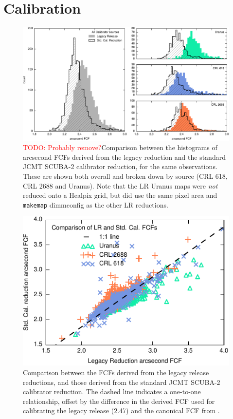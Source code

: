 \documentclass[twocolumn]{aastex6}
\newcommand{\todo}[1]{\textcolor{red}{TODO: #1}}
\begin{document}
\section{Calibration}
\begin{figure}
\includegraphics{legacyFCF-caldbFCF-histograms.pdf}
\caption{\todo{Probably remove?}Comparison between the histograms of
  arcsecond FCFs derived from the legacy reduction and the standard
  JCMT SCUBA-2 calibrator reduction, for the same observations.
  These are shown both overall and broken down by source (CRL 618,
  CRL 2688 and Uranus). Note that the LR Uranus maps were \emph{not}
  reduced onto a Healpix grid, but did use the same pixel area and
  \texttt{makemap} dimmconfig as the other LR reductions.\label{fig:lr-caldb-histo}}
\end{figure}
\begin{figure}
\includegraphics{legacyFCF-caldbFCF-scatter.pdf}
\caption{Comparison between the FCFs derived from the legacy release
  reductions, and those derived from the standard JCMT SCUBA-2
  calibrator reduction. The dashed line indicates a one-to-one
  relationship, offset by the difference in the derived FCF used for
  calibrating the legacy release (2.47) and the canonical FCF from
  \citet[2.34]{Dempsey2013}. \label{fig:lr-caldb-scatter} }
\end{figure}
\end{document}
